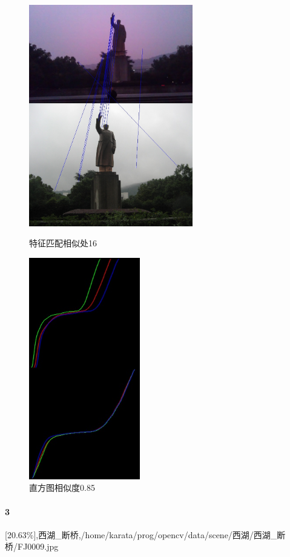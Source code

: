 \begin{figure}[htb]
\begin{minipage}[t]{0.5\linewidth}
\centering
\includegraphics[height=3.8in]{玉泉毛像.jpg.d/im2sift.jpg}
\caption{特征匹配相似处16}
\label{fig:side:a}
\end{minipage}%
\begin{minipage}[t]{0.5\linewidth}
\centering
\includegraphics[height=3.8in]{玉泉毛像.jpg.d/im2hist2.jpg}
\caption{直方图相似度0.85}
\label{fig:side:a}
\end{minipage}%
\end{figure}

\paragraph{3}
[20.63\%],西湖_断桥,/home/karata/prog/opencv/data/scene/西湖/西湖_断桥/FJ0009.jpg

